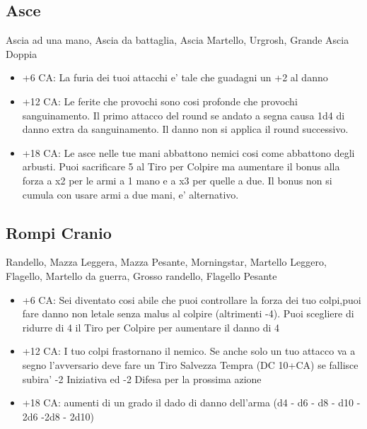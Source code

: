 \documentclass[a4paper,11pt,twoside,openany]{book}
\begin{document}
\subsection{Asce} Ascia ad una mano, Ascia da battaglia, Ascia Martello, Urgrosh, Grande Ascia Doppia

\begin{itemize}

\item +6 CA: La furia dei tuoi attacchi e' tale che guadagni un +2 al danno

\item +12 CA: Le ferite che provochi sono cosi profonde che provochi sanguinamento. Il primo attacco del round se andato a segna causa 1d4 di danno extra da sanguinamento. Il danno non si applica il round successivo.

\item +18 CA: Le asce nelle tue mani abbattono nemici cosi come abbattono degli arbusti. Puoi sacrificare 5 al Tiro per Colpire ma aumentare il bonus alla forza a x2 per le armi a 1 mano e a x3 per quelle a due. Il bonus non si cumula con usare armi a due mani, e' alternativo.

\end{itemize}

\subsection{Rompi Cranio} Randello, Mazza Leggera, Mazza Pesante, Morningstar,
Martello Leggero, Flagello, Martello da guerra, Grosso randello, Flagello
Pesante

\begin{itemize}
	\item +6 CA: Sei diventato cosi abile che puoi controllare la forza dei tuo colpi,puoi fare danno non letale senza malus al colpire (altrimenti -4). Puoi scegliere di ridurre di 4 il Tiro per Colpire per aumentare il danno di 4 
	
	\item +12 CA: I tuo colpi frastornano il nemico. Se anche solo un tuo attacco va a segno l'avversario deve fare un Tiro Salvezza Tempra (DC 10+CA) se fallisce subira' -2 Iniziativa ed -2 Difesa per la prossima azione 
	
	\item +18 CA: aumenti di un grado il dado di danno dell'arma (d4 - d6 - d8 - d10 - 2d6 -2d8 - 2d10)
\end{itemize}
\end{document}
